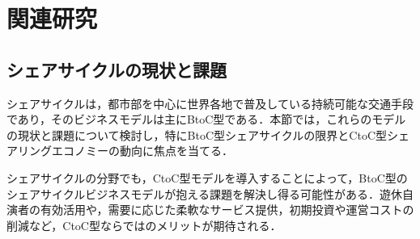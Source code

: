 \section{関連研究}
  \label{sec:関連研究}
    \par
  
  \subsection{シェアサイクルの現状と課題}
    \label{sec:シェアサイクルの現状と課題}
      \par シェアサイクルは，都市部を中心に世界各地で普及している持続可能な交通手段であり，そのビジネスモデルは主にBtoC型である．本節では，これらのモデルの現状と課題について検討し，特にBtoC型シェアサイクルの限界とCtoC型シェアリングエコノミーの動向に焦点を当てる．
      \par シェアサイクルの分野でも，CtoC型モデルを導入することによって，BtoC型のシェアサイクルビジネスモデルが抱える課題を解決し得る可能性がある．遊休自演者の有効活用や，需要に応じた柔軟なサービス提供，初期投資や運営コストの削減など，CtoC型ならではのメリットが期待される．
      
